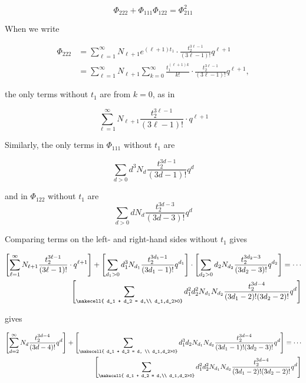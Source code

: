 \documentclass{amsart}
\begin{document}
\[ \Phi_{222} + \Phi_{111}\Phi_{122} = \Phi_{211}^2 \] 

When we write

\begin{align*}
    \Phi_{222} &= \sum_{\ell=1}^\infty N_{\ell+1} e^{(\ell + 1)t_1} \cdot \frac{ t_2^{3\ell - 1}}{(3\ell-1)!} q^{\ell+1}\\
    &= \sum_{\ell=1}^\infty N_{\ell+1} \sum_{k=0}^\infty \frac{ t_1^{(\ell+1)k}}{k!} \cdot \frac{ t_2^{3\ell -1 }}{(3\ell-1)!} q^{\ell+1}, 
\end{align*}

the only terms without $t_1$ are from $k=0$, as in

\[ \sum_{\ell=1}^\infty N_{\ell+1} \frac{ t_2^{3\ell -1 }}{(3\ell-1)!} \cdot q^{\ell + 1 } \] 

Similarly, the only terms in $\Phi_{111}$ without $t_1$ are

\[ \sum_{d>0} d^3 N_d \frac{ t_2^{3d-1}}{(3d-1)!} q^d \] 

and in $\Phi_{122}$ without $t_1$ are \[ \sum_{d>0}d N_d \frac{ t_2^{3d-3}}{(3d-3)!} q^d \] 

Comparing terms on the left- and right-hand sides without $t_1$ gives

\begin{align*}
    \left[ \sum_{\ell=1}^\infty N_{\ell+1} \frac{ t_2^{3\ell -1 }}{(3\ell-1)!} \cdot q^{\ell + 1 } \right] + \left[\sum_{d_1>0} d_1^3 N_{d_1} \frac{ t_2^{3d_1-1}}{(3d_1-1)!} q^{d_1} \right] \cdot \left[ \sum_{d_2>0}d_2 N_{d_2} \frac{ t_2^{3d_2-3}}{(3d_2-3)!} q^{d_2}    \right] =  \cdots \\
  \left[   \sum_{ \makecell{ d_1 + d_2 = d,\\ d_1,d_2>0}} d_1^2 d_2^2 N_{d_1} N_{d_2} \frac{ t_2^{3d-4} }{(3d_1-2)! (3d_2-2)!} q^d  \right] 
\end{align*}

gives

\begin{align*}
    \left[ \sum_{d=2}^\infty N_d \frac{ t_2^{3d-4}}{(3d-4)!} q^d \right]  +  \left[ \sum_{ \makecell{ d_1 + d_2 = d, \\ d_1,d_2>0}} d_1^3 d_2 N_{d_1} N_{d_2} \frac{t_2^{3d - 4}}{(3d_1-1)!(3d_2-3)!} q^d \right] = \cdots  \\
     \left[ \sum_{ \makecell{ d_1 + d_2 = d,\\ d_1,d_2>0}} d_1^2 d_2^2 N_{d_1} N_{d_2} \frac{ t_2^{3d-4} }{(3d_1-2)! (3d_2-2)!} q^d \right] 
\end{align*}
\end{document}
